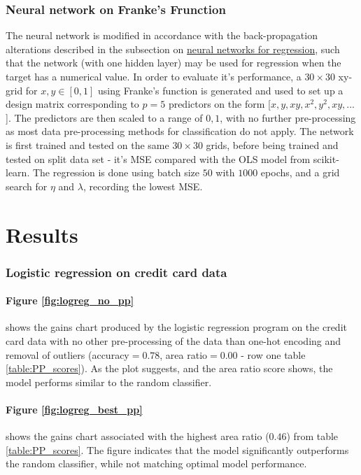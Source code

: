 \documentclass[%
oneside,                 %
final,                   %
10pt]{article}
\begin{document}
\subsubsection{Neural network on Franke's Frunction}
The neural network is modified in accordance with the back-propagation alterations described in the subsection on  \hyperref[Section_M_NNregression]{neural networks for regression}, such that the network (with one hidden layer) may be used for regression when the target has a numerical value. In order to evaluate it's performance, a $30 \times 30$ xy-grid for $x,y\in [0,1]$ using Franke's function \cite{P1_JN} is generated and used to set up a design matrix corresponding to $p=5$ predictors on the form [$x,y,xy,x^2,y^2,xy, ...$]. The predictors are then scaled to a range of $0,1$, with no further pre-processing as most data pre-processing methods for classification do not apply. The network is first trained and tested on the same $30 \times 30$ grids, before being trained and tested on split data set -  it's MSE compared with the OLS model from scikit-learn. The regression is done using batch size $50$ with $1000$ epochs, and a grid search for $\eta$ and $\lambda$, recording the lowest MSE.

\section{Results} \label{Section_Results}
\subsubsection{Logistic regression on credit card data}\label{results_evaluation_pp}
\paragraph{Figure \ref{fig:logreg_no_pp}} shows the gains chart produced by the logistic regression program on the credit card data with no other pre-processing of the data than one-hot encoding and removal of outliers (accuracy$=0.78$, area ratio$=0.00$ - row one table \ref{table:PP_scores}). As the plot suggests, and the area ratio score shows, the model performs similar to the random classifier.

\paragraph{Figure \ref{fig:logreg_best_pp}}  shows the gains chart associated with the highest area ratio ($0.46$) from table \ref{table:PP_scores}. The figure indicates that the model significantly outperforms the random classifier, while not matching optimal model performance.
\end{document}
